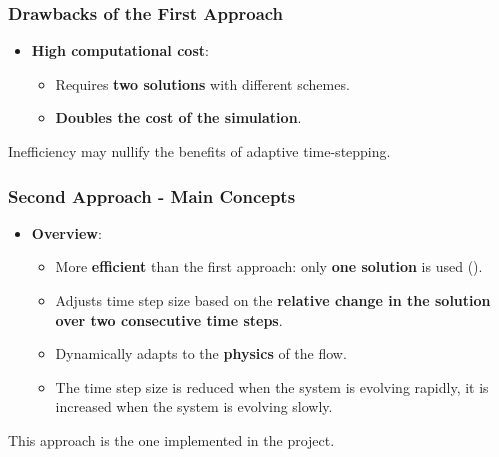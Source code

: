 \documentclass{settings/laserbeam}
\begin{document}
\begin{frame}
    
    \frametitle{Drawbacks of the First Approach}

    \begin{cbox}
    \begin{itemize}
        \item \textbf{High computational cost}:
        \begin{itemize}
            \item Requires \textbf{two solutions} with different schemes.
            \item \textbf{Doubles the cost of the simulation}.
        \end{itemize}
    \end{itemize}
    \end{cbox}
    \vspace{0.5cm}
    \begin{warning}
        Inefficiency may nullify the benefits of adaptive time-stepping.
    \end{warning}
\end{frame}

\begin{frame}

    \frametitle{Second Approach - Main Concepts}

    \begin{cbox}
    \begin{itemize}
        \item \textbf{Overview}:
        \begin{itemize}
            \item More \textbf{efficient} than the first approach: only \textbf{one solution} is used ().
            \item Adjusts time step size based on the \textbf{relative change in the solution over two consecutive time steps}.
            \item Dynamically adapts to the \textbf{physics} of the flow.
            \item The time step size is reduced when the system is evolving rapidly, it is increased when the system is evolving slowly.
        \end{itemize}
    \end{itemize}
    \end{cbox}
    \vspace{0.5cm}
    \begin{blueinfo}
        This approach is the one implemented in the project.
    \end{blueinfo}
\end{frame}
\end{document}
